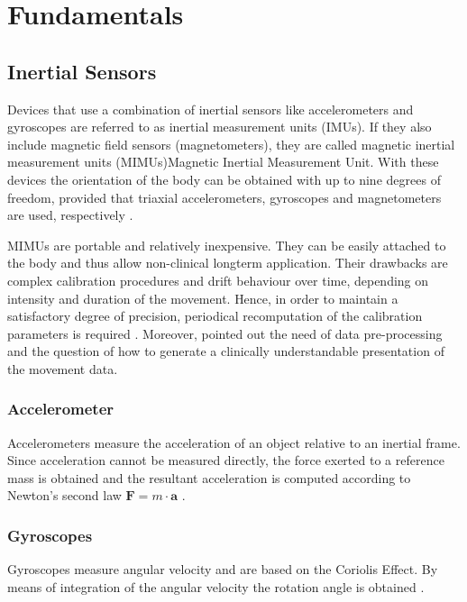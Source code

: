 \chapter{Fundamentals}
\label{ch:Fundamentals}

\section{Inertial Sensors}

Devices that use a combination of inertial sensors like accelerometers and gyroscopes are referred to as inertial measurement units (IMUs). If they also include magnetic field sensors (magnetometers), they are called magnetic inertial measurement units (MIMUs){Magnetic Inertial Measurement Unit}. With these devices the orientation of the body can be obtained with up to nine degrees of freedom, provided that triaxial accelerometers, gyroscopes and magnetometers are used, respectively \cite{olivares_vicente_signal_2013}.

MIMUs are portable and relatively inexpensive. They can be easily attached to the body and thus allow non-clinical longterm application. Their drawbacks are complex calibration procedures and drift behaviour over time, depending on intensity and duration of the movement. Hence, in order to maintain a satisfactory degree of precision, periodical recomputation of the calibration parameters is required \cite{olivares_vicente_signal_2013}. Moreover, \citeauthor{mancini_isway:_2012} \cite{mancini_isway:_2012} pointed out the need of data pre-processing and the question of how to generate a clinically understandable presentation of the movement data.


\subsection{Accelerometer}

Accelerometers measure the acceleration of an object relative to an inertial frame. Since acceleration cannot be measured directly, the force exerted to a reference mass is obtained and the resultant acceleration is computed according to Newton's second law $ \mathbf{F} = m \cdot \mathbf a $ \cite{encyclopedia_britannica_accelerometer_2014}.


\subsection{Gyroscopes}

Gyroscopes measure angular velocity and are based on the Coriolis Effect. By means of integration of the angular velocity the rotation angle is obtained \cite{olivares_vicente_signal_2013}.


